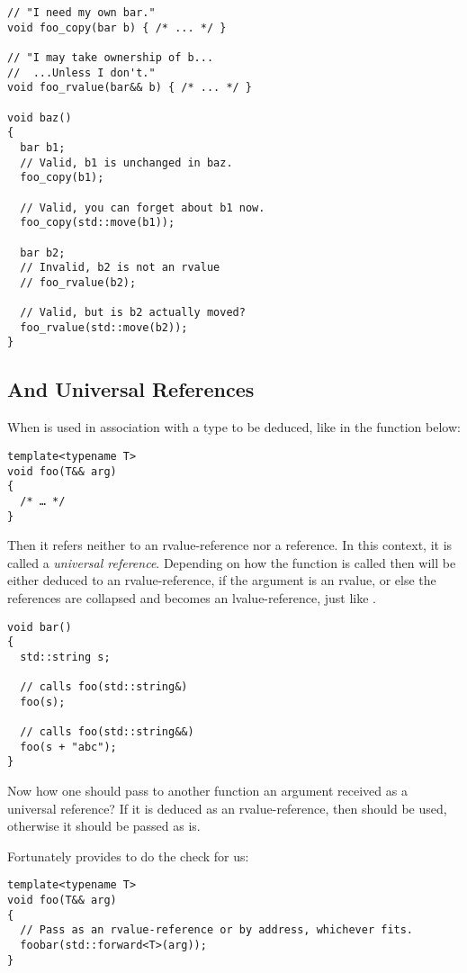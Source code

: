 \begin{lstlisting}
// "I need my own bar."
void foo_copy(bar b) { /* ... */ }

// "I may take ownership of b...
//  ...Unless I don't."
void foo_rvalue(bar&& b) { /* ... */ }

void baz()
{
  bar b1;
  // Valid, b1 is unchanged in baz.
  foo_copy(b1);

  // Valid, you can forget about b1 now.
  foo_copy(std::move(b1));
  
  bar b2;
  // Invalid, b2 is not an rvalue
  // foo_rvalue(b2);

  // Valid, but is b2 actually moved?
  foo_rvalue(std::move(b2));
}
\end{lstlisting}

\subsection{ And Universal References}

When \code{\&\&} is used in association with a type to be deduced,
like in the function below:

\begin{lstlisting}
template<typename T>
void foo(T&& arg)
{
  /* … */
}
\end{lstlisting}

Then it refers neither to an rvalue-reference nor a reference. In this
context, it is called a \emph{universal reference}. Depending on how
the function is called then  will be either deduced to an
rvalue-reference, if the argument is an rvalue, or else the references
are collapsed and  becomes an lvalue-reference, just like
.

\begin{lstlisting}
void bar()
{
  std::string s;

  // calls foo(std::string&)
  foo(s);

  // calls foo(std::string&&)
  foo(s + "abc");
}
\end{lstlisting}

Now how one should pass to another function an argument received as a
universal reference? If it is deduced as an rvalue-reference, then
 should be used, otherwise it should be passed as
is.

Fortunately  provides  to do the check for
us:

\begin{lstlisting}
template<typename T>
void foo(T&& arg)
{
  // Pass as an rvalue-reference or by address, whichever fits.
  foobar(std::forward<T>(arg));
}
\end{lstlisting}
